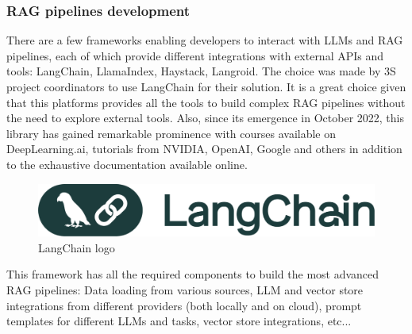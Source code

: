 \subsubsection*{RAG pipelines development}
There are a few frameworks enabling developers to interact with LLMs and RAG pipelines, each of which provide different integrations with external APIs and tools: LangChain, LlamaIndex, Haystack, Langroid.\newline
The choice was made by 3S project coordinators to use LangChain for their solution. It is a great choice given that this platforms provides all the tools to build complex RAG pipelines without the need to explore external tools. Also, since its emergence in October 2022, this library has gained remarkable prominence with courses available on DeepLearning.ai, tutorials from NVIDIA, OpenAI, Google and others in addition to the exhaustive documentation available online.
\begin{figure}[htbp]
    \centering
    \includegraphics[width=.5\linewidth]{./figures/langchain-logo.png}
    \caption{LangChain logo}
\end{figure}\newline
This framework has all the required components to build the most advanced RAG pipelines: Data loading from various sources, LLM and vector store integrations from different providers (both locally and on cloud), prompt templates for different LLMs and tasks, vector store integrations, etc...
